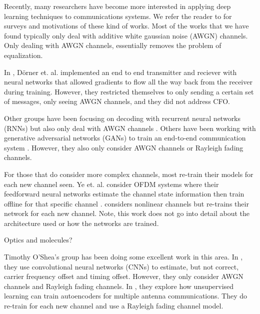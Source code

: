 Recently, many researchers have become more interested in applying deep learning techniques to communications systems.  
We refer the reader to \cite{botoca}\cite{diamandis}\cite{wang}\cite{hemodel}\cite{osheaphys} for surveys and motivations of these kind of works.  
Most of the works that we have found typically only deal with additive white gaussian noise (AWGN) channels. Only dealing with AWGN channels, essentially removes the problem of equalization. 

In \cite{dorner2017}, D\"{o}rner et. al. implemented an end to end transmitter and reciever with neural networks that allowed gradients to flow all the way back from the receiver during training.  
However, they restricted themselves to only sending a certain set of messages, only seeing AWGN channels, and they did not address CFO. 

Other groups have been focusing on decoding with recurrent neural networks (RNNs) but also only deal with AWGN channels \cite{kim2018}\cite{kimnips}.  
Others have been working with generative adversarial networks (GANs) to train an end-to-end communication system \cite{yegans}.  However, they also only consider AWGN channels or Rayleigh fading channels.

For those that do consider more complex channels, most re-train their models for each new channel seen.  Ye et. al. consider OFDM systems where their feedforward neural networks estimate the channel state information then train offline for that specific channel \cite{ye2018}.  
\cite{raghavendra} considers nonlinear channels but re-trains their network for each new channel.  Note, this work does not go into detail about the architecture used or how the networks are trained. 

Optics and molecules? \cite{farsad2018}

Timothy O'Shea's group has been doing some excellent work in this area. 
In \cite{osheacsi}, they use convolutional neural networks (CNNs) to estimate, but not correct, carrier frequency offset and timing offset.  However, they only consider AWGN channels and Rayleigh fading channels.  
In \cite{osheamimo}, they explore how unsupervised learning can train autoencoders for multiple antenna communications.  They do re-train for each new channel and use a Rayleigh fading channel model.

\cite{osheavoid}
\cite{osheasynch}
\cite{osheaphys}
\cite{osheaatt}
